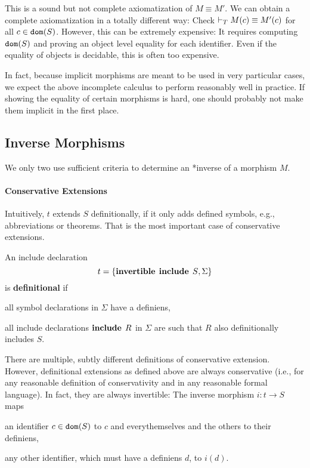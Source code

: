 This is a sound but not complete axiomatization of $M\equiv M'$.
We can obtain a complete axiomatization in a totally different way: Check $\vdash_T M(c)\equiv M'(c)$ for all $c\in\mathtt{dom}(S)$.
However, this can be extremely expensive: It requires computing $\mathtt{dom}(S)$ and proving an object level equality for each identifier.
Even if the equality of objects is decidable, this is often too expensive.

In fact, because implicit morphisms are meant to be used in very particular cases, we expect the above incomplete calculus to perform reasonably well in practice.
If showing the equality of certain morphisms is hard, one should probably not make them implicit in the first place.


\subsection{Inverse Morphisms}\label{sec:inverse}

We only two use sufficient criteria to determine an *inverse of a morphism $M$.

\paragraph{Conservative Extensions}
Intuitively, $t$ extends $S$ definitionally, if it only adds defined symbols, e.g., abbreviations or theorems.
That is the most important case of conservative extensions.

\begin{definition}
An include declaration \[t=\{\operatorname{\mathbf{invertible}}\;\operatorname{\mathbf{include}}{\;S},\Sigma\}\] is \textbf{definitional} if
\begin{compactitem}
 \item all symbol declarations in $\Sigma$ have a definiens,
 \item all include declarations $\operatorname{\mathbf{include}}{\;R}$ in $\Sigma$ are such that $R$ also definitionally includes $S$.
\end{compactitem}
\end{definition}

There are multiple, subtly different definitions of conservative extension.
However, definitional extensions as defined above are always conservative (i.e., for any reasonable definition of conservativity and in any reasonable formal language).
In fact, they are always invertible: The inverse morphism $i:t\to S$ maps
\begin{compactitem}
 \item an identifier $c\in\mathtt{dom}(S)$ to $c$ and everythemselves and the others to their definiens,
 \item any other identifier, which must have a definiens $d$, to $i(d)$.
\end{compactitem}

